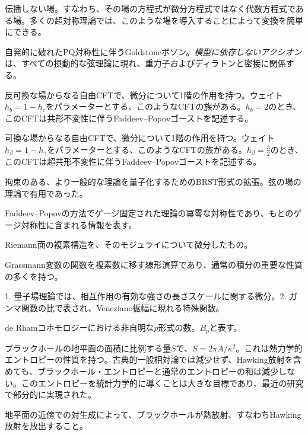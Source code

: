 {伝播しない場。すなわち、その場の方程式が微分方程式ではなく代数方程式である場。多くの超対称理論では、このような場を導入することによって変換を簡単にできる。}

{自発的に破れたPQ対称性に伴うGoldstoneボソン。\emph{模型に依存しないアクシオン}は、すべての摂動的な弦理論に現れ、重力子およびディラトンと密接に関係する。}

{反可換な場からなる自由CFTで、微分について1階の作用を持つ。ウェイト$h_b=1-h_c$をパラメーターとする、このようなCFTの族がある。$h_b=2$のとき、このCFTは共形不変性に伴うFaddeev--Popovゴーストを記述する。}

{可換な場からなる自由CFTで、微分について1階の作用を持つ。ウェイト$h_\beta=1-h_\gamma$をパラメーターとする、このようなCFTの族がある。$h_\beta=\frac32$のとき、このCFTは超共形不変性に伴うFaddeev--Popovゴーストを記述する。}

{拘束のある、より一般的な理論を量子化するためのBRST形式の拡張。弦の場の理論で有用であった。}

{Faddeev--Popovの方法でゲージ固定された理論の冪零な対称性であり、もとのゲージ対称性に含まれる情報を表す。}

{Riemann面の複素構造を、そのモジュライについて微分したもの。}

{Grassmann変数の関数を複素数に移す線形演算であり、通常の積分の重要な性質の多くを持つ。}

{1. 量子場理論では、相互作用の有効な強さの長さスケールに関する微分。2. ガンマ関数の比で表され、Veneziano振幅に現れる特殊関数。}

{de Rhamコホモロジーにおける非自明な$p$形式の数。$B_p$と表す。}

{ブラックホールの地平面の面積に比例する量$S$で、$S=2\pi A/\kappa^2$。これは熱力学的エントロピーの性質を持つ。古典的一般相対論では減少せず、Hawking放射を含めても、ブラックホール・エントロピーと通常のエントロピーの和は減少しない。このエントロピーを統計力学的に導くことは大きな目標であり、最近の研究で部分的に実現された。}

{地平面の近傍での対生成によって、ブラックホールが熱放射、すなわちHawking放射を放出すること。}

